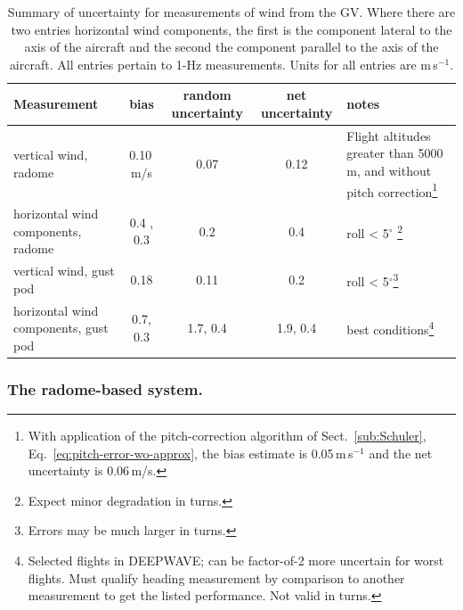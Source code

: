 \documentclass[12pt,twoside,english]{article}\usepackage[]{graphicx}\usepackage[]{color}
\providecommand{\tabularnewline}{\\}
\begin{document}
\begin{table}
\noindent \centering{}%
\begin{minipage}[t]{1\columnwidth}%
\protect\caption[Summary of uncertainty for measurements of wind from the GV.]{Summary of uncertainty for measurements of wind from the GV. Where there are two
entries horizontal wind components, the first is the component lateral
to the axis of the aircraft and the second the component parallel to the
axis of the aircraft. All entries pertain to 1-Hz measurements. Units for all entries are m\,s$^{-1}$.\label{tab:Summary-of-uncertainty}}


\noindent \begin{center}
\begin{tabular}{>{\centering}p{3cm}ccc>{\centering}p{2.5cm}}
\toprule 
\textbf{Measurement}  &
\textbf{bias}  &
\textbf{random uncertainty}  &
\textbf{net uncertainty}  &
\textbf{notes}\tabularnewline
\midrule
\midrule 
vertical wind, radome  &
0.10\,m/s  &
0.07  &
0.12  &
Flight altitudes greater than 5000 m, and without pitch correction\footnote{With application of the pitch-correction algorithm of Sect.~\ref{sub:Schuler},
Eq.~\ref{eq:pitch-error-wo-approx}, the bias estimate is 0.05\,m\,s$^{-1}$
and the net uncertainty is 0.06\,m/s.}\tabularnewline
\midrule 
horizontal wind components, radome  &
0.4 , 0.3  &
0.2  &
0.4  &
roll < 5$^{\circ}$ \footnote{Expect minor degradation in turns.}\tabularnewline
\midrule 
vertical wind, gust pod  &
0.18  &
0.11  &
0.2  &
roll < 5$^{\circ}$\footnote{Errors may be much larger in turns.}\tabularnewline
\midrule 
horizontal wind components, gust pod  &
0.7, 0.3  &
1.7, 0.4  &
1.9, 0.4  &
best conditions\footnote{Selected flights in DEEPWAVE; can be factor-of-2 more uncertain for
worst flights. Must qualify heading measurement by comparison to another
measurement to get the listed performance. Not valid in turns.}\tabularnewline
\bottomrule
\end{tabular}
\par\end{center}%
\end{minipage}
\end{table}



\subsubsection{The radome-based system. }
\end{document}
